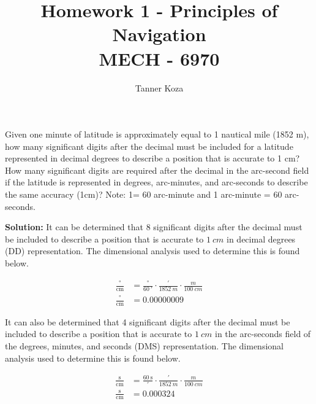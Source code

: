 \documentclass[12pt,letterpaper, onecolumn]{exam}
\renewcommand{\solution}{\noindent\textbf{Solution:}\enspace}
\begin{document}
\title{Homework 1 - Principles of Navigation \\
    \large MECH - 6970}
\author{Tanner Koza}
\maketitle
\pointsdroppedatright
\printanswers

\thispagestyle{empty}

\begin{questions}
    \question
    Given one minute of latitude is approximately equal to 1 nautical mile (1852 m), how many significant digits after the decimal must be included for a latitude represented in decimal degrees to describe a position that is accurate to 1 cm? How many significant digits are required after the decimal in the arc-second field if the latitude is represented in degrees, arc-minutes, and arc-seconds to describe the same accuracy (1cm)? Note: 1\degree = 60 arc-minute and 1 arc-minute = 60 arc-seconds.

    \solution
    It can be determined that 8 significant digits after the decimal must be included to describe a position that is accurate to $1~\si{cm}$ in decimal degrees (DD) representation. The dimensional analysis used to determine this is found below.

    \begin{equation*}
        \begin{split}
            \frac{\unit{\degree}}{\unit{\cm}}  & = \frac{\unit{\degree}}{60~\unit{\arcminute}}\cdot\frac{\unit{\arcminute}}{1852~\si{m}}\cdot\frac{\si{m}}{100~\si{cm}} \\
            \frac{\unit{\degree}}{\unit{\cm}} & = \num{0.00000009}
        \end{split}
    \end{equation*}

    It can also be determined that 4 significant digits after the decimal must be included to describe a position that is accurate to  $1~\si{cm}$ in the arc-seconds field of the degrees, minutes, and seconds (DMS) representation. The dimensional analysis used to determine this is found below.

    \begin{equation*}
        \begin{split}
            \frac{\unit{\second}}{\unit{\cm}}  & = \frac{60~\unit{\second}}{\unit{\arcminute}}\cdot\frac{\unit{\arcminute}}{1852~\si{m}}\cdot\frac{\si{m}}{100~\si{cm}} \\
            \frac{\unit{\second}}{\unit{\cm}} & = \num{0.000324}
        \end{split}
    \end{equation*}


\end{questions}
\end{document}
